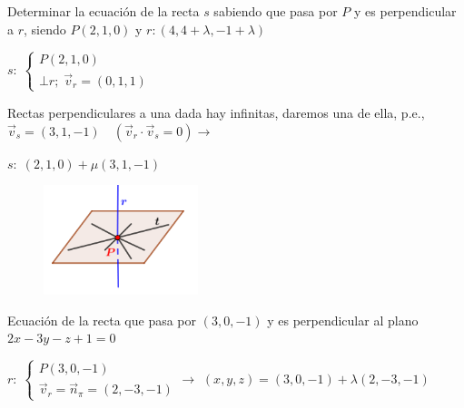\begin{ejre} Determinar la ecuación de la recta $s$ sabiendo que pasa por $P$ y es perpendicular a $r$, siendo $P(2,1,0)$ y $r:(4, 4+\lambda, -1+\lambda)$	
\end{ejre}
\begin{proofw}\renewcommand{\qedsymbol}{$\diamond$}	
	$s:\; \begin{cases} P(2,1,0) \\ \bot r;\; \vec v_r=(0,1,1) \end{cases}$
	\begin{multicols}{2}
	Rectas perpendiculares a una dada hay infinitas, daremos una de ella, p.e., $\vec v_s=(3,1,-1) \quad (\vec v_r \cdot \vec v_s=0) \to $
	
	$s:\; (2,1,0)+\mu(3,1,-1)$
	 \begin{figure}[H]
		\centering
		\includegraphics[width=0.4\textwidth]{imagenes/imagenes11/T11IM24.png}
	\end{figure}
	\end{multicols}
\end{proofw}

\begin{ejre} Ecuación de la recta que pasa por $(3,0,-1)$ y es perpendicular al plano $2x-3y-z+1=0$	
\end{ejre}
\begin{proofw}\renewcommand{\qedsymbol}{$\diamond$}	

\small{$r:\; \begin{cases} P(3,0,-1) \\ \vec v_r=\vec n_{\pi}=(2,-3,-1) \end{cases}$}\normalsize{$\to$}
$(x,y,z)=(3,0,-1)+\lambda(2,-3,-1)$ 	
\end{proofw}


